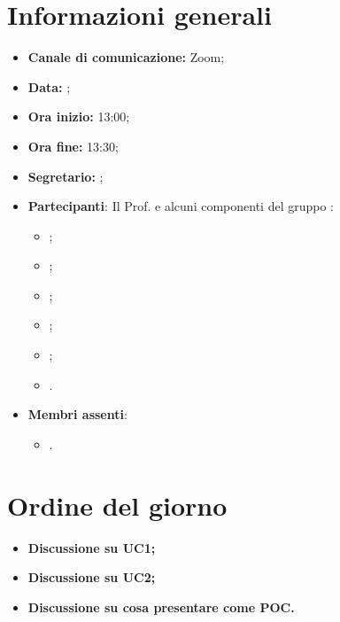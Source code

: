 \section{Informazioni generali}

\begin{itemize}

    \item \textbf{Canale di comunicazione:} Zoom;

    \item \textbf{Data:} \DataMeeting{};
    
    \item \textbf{Ora inizio:} 13:00;

    \item \textbf{Ora fine:} 13:30;

    \item \textbf{Segretario:} \Davide{};

    \item \textbf{Partecipanti}: Il Prof. \Riccardo{} e alcuni componenti del gruppo \Gruppo{}:
    
        \begin{itemize}
            \item \Daniele{};
            \item \Davide{};
            \item \Francesco{};
            \item \Giosue{};
            \item \Lucrezia{};
            \item \Matteo{}.
        \end{itemize}

    \item \textbf{Membri assenti}:
        \begin{itemize}
            \item \Tommaso{}.
        \end{itemize}
    \end{itemize}
\section{Ordine del giorno}

\begin{itemize}
    \item\textbf{Discussione su UC1;}
    \item\textbf{Discussione su UC2;}
    \item\textbf{Discussione su cosa presentare come POC.}
\end{itemize}

